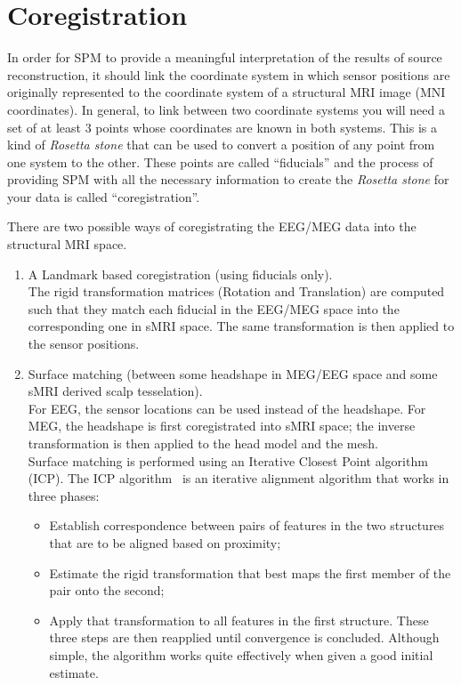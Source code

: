 \section{Coregistration}

In order for SPM to provide a meaningful interpretation of the results of source reconstruction, it should link the coordinate system in which sensor positions are originally represented to the coordinate system of a structural MRI image (MNI coordinates). In general, to link between two coordinate systems you will need a set of at least 3 points whose coordinates are known in both systems. This is a kind of \textit{Rosetta stone} that can be used to convert a position of any point from one system to the other. These points are called ``fiducials'' and the process of providing SPM with all the necessary information to create the \textit{Rosetta stone} for your data is called ``coregistration''.

There are two possible ways of coregistrating the EEG/MEG data into the structural MRI space.

\begin{enumerate}
    \item A Landmark based coregistration (using fiducials only).\\
    The rigid transformation matrices (Rotation and Translation) are computed such that they match each fiducial in the EEG/MEG space into the corresponding one in sMRI space. The same transformation is then applied to the sensor positions.
    \item Surface matching (between some headshape in MEG/EEG space and some sMRI derived scalp tesselation).\\
    For EEG, the sensor locations can be used instead of the headshape. For MEG, the headshape is first coregistrated into sMRI space; the inverse transformation is then applied to the head model and the mesh.\\
Surface matching is performed using an Iterative Closest Point algorithm (ICP). The ICP algorithm~\cite{Besl_McKay} is an iterative alignment algorithm that works in three phases:
\begin{itemize}
    \item Establish correspondence between pairs of features in the two structures that are to be aligned based on proximity;
    \item Estimate the rigid transformation that best maps the first member of the pair onto the second;
    \item Apply that transformation to all features in the first structure. These three steps are then reapplied until convergence is concluded. Although simple, the algorithm works quite effectively when given a good initial estimate.
\end{itemize}
\end{enumerate}

